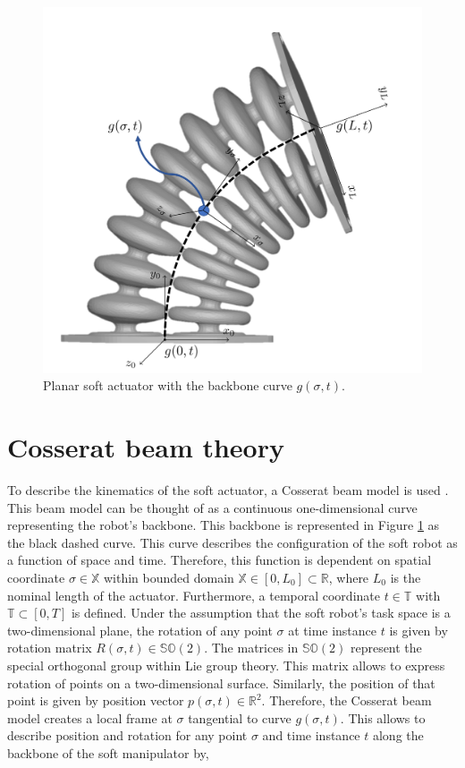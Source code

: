 \begin{figure}[H]
\begin{minipage}{.5\textwidth}
    \includegraphics[width=\textwidth]{Figures/Chapter2/actuatorschematic.png}
    \vspace{15pt}
    \caption{Planar soft actuator with the backbone curve $g(\sigma,t)$.}
    \label{fig2:kinematicschematic}
\end{minipage}
\end{figure}





\section{Cosserat beam theory}

To describe the kinematics of the soft actuator, a Cosserat beam model is used \cite{Boyer2019}. This beam model can be thought of as a continuous one-dimensional curve representing the robot's backbone. This backbone is represented in Figure \ref{fig2:kinematicschematic} as the black dashed curve. This curve describes the configuration of the soft robot as a function of space and time. Therefore, this function is dependent on spatial coordinate $\sigma \in \mathbb{X}$ within bounded domain $\mathbb{X} \in [0,L_0] \subset \mathbb{R}$, where $L_0$ is the nominal length of the actuator. Furthermore, a temporal coordinate $t \in \mathbb{T}$ with $\mathbb{T} \subset [0,T]$ is defined. Under the assumption that the soft robot's task space is a two-dimensional plane, the rotation of any point $\sigma$ at time instance $t$ is given by rotation matrix $R(\sigma,t) \in \mathbb{SO}(2)$. The matrices in $\mathbb{SO}(2)$ represent the special orthogonal group within Lie group theory. This matrix allows to express rotation of points on a two-dimensional surface. Similarly, the position of that point is given by position vector $p(\sigma,t) \in \mathbb{R}^2$. Therefore, the Cosserat beam model creates a local frame at $\sigma$ tangential to curve $g(\sigma,t)$. This allows to describe position and rotation for any point $\sigma$ and time instance $t$ along the backbone of the soft manipulator by,


